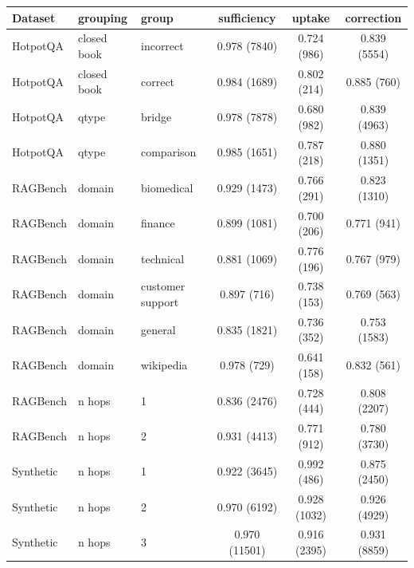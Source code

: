 \begin{tabular}{lllccc}
\toprule
Dataset & grouping & group & sufficiency & uptake & correction \\
\midrule
HotpotQA & closed book & incorrect & 0.978 (7840) & 0.724 (986) & 0.839 (5554) \\
HotpotQA & closed book & correct & 0.984 (1689) & 0.802 (214) & 0.885 (760) \\
HotpotQA & qtype & bridge & 0.978 (7878) & 0.680 (982) & 0.839 (4963) \\
HotpotQA & qtype & comparison & 0.985 (1651) & 0.787 (218) & 0.880 (1351) \\
RAGBench & domain & biomedical & 0.929 (1473) & 0.766 (291) & 0.823 (1310) \\
RAGBench & domain & finance & 0.899 (1081) & 0.700 (206) & 0.771 (941) \\
RAGBench & domain & technical & 0.881 (1069) & 0.776 (196) & 0.767 (979) \\
RAGBench & domain & customer support & 0.897 (716) & 0.738 (153) & 0.769 (563) \\
RAGBench & domain & general & 0.835 (1821) & 0.736 (352) & 0.753 (1583) \\
RAGBench & domain & wikipedia & 0.978 (729) & 0.641 (158) & 0.832 (561) \\
RAGBench & n hops & 1 & 0.836 (2476) & 0.728 (444) & 0.808 (2207) \\
RAGBench & n hops & 2 & 0.931 (4413) & 0.771 (912) & 0.780 (3730) \\
Synthetic & n hops & 1 & 0.922 (3645) & 0.992 (486) & 0.875 (2450) \\
Synthetic & n hops & 2 & 0.970 (6192) & 0.928 (1032) & 0.926 (4929) \\
Synthetic & n hops & 3 & 0.970 (11501) & 0.916 (2395) & 0.931 (8859) \\
\bottomrule
\end{tabular}